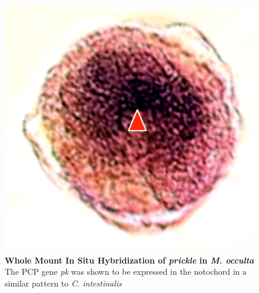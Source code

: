 \begin{figure}[tbp]
\centering
\includegraphics[scale=0.55]{figures/prickle.pdf}
\caption{\textbf{Whole Mount In Situ Hybridization of \textit{prickle} in \textit{M. occulta}} The PCP gene \textit{pk} was shown to be expressed in the notochord in a similar pattern to \textit{C. intestinalis} }
\label{fig:prickle}
\end{figure}